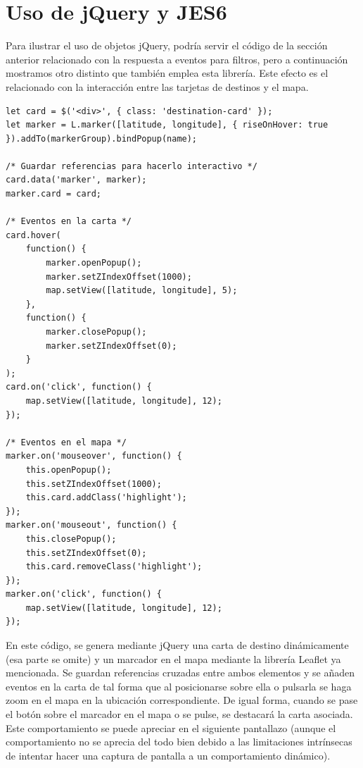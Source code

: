 \documentclass[11pt, a4paper]{book}
\begin{document}
	
	\section{Uso de jQuery y JES6}

    Para ilustrar el uso de objetos jQuery, podría servir el código de la sección anterior relacionado con la respuesta a eventos para filtros, pero a continuación mostramos otro distinto que también emplea esta librería. Este efecto es el relacionado con la interacción entre las tarjetas de destinos y el mapa. 

    \begin{lstlisting}
let card = $('<div>', { class: 'destination-card' });
let marker = L.marker([latitude, longitude], { riseOnHover: true }).addTo(markerGroup).bindPopup(name);

/* Guardar referencias para hacerlo interactivo */
card.data('marker', marker);
marker.card = card;

/* Eventos en la carta */
card.hover(
    function() {
        marker.openPopup();
        marker.setZIndexOffset(1000);
        map.setView([latitude, longitude], 5);
    },
    function() {
        marker.closePopup();
        marker.setZIndexOffset(0);
    }
);
card.on('click', function() {
    map.setView([latitude, longitude], 12);
});

/* Eventos en el mapa */
marker.on('mouseover', function() {
    this.openPopup();
    this.setZIndexOffset(1000);
    this.card.addClass('highlight');
});
marker.on('mouseout', function() {
    this.closePopup();
    this.setZIndexOffset(0);
    this.card.removeClass('highlight');
});
marker.on('click', function() {
    map.setView([latitude, longitude], 12);
});
    \end{lstlisting}

    En este código, se genera mediante jQuery una carta de destino dinámicamente (esa parte se omite) y un marcador en el mapa mediante la librería Leaflet ya mencionada. Se guardan referencias cruzadas entre ambos elementos y se añaden eventos en la carta de tal forma que al posicionarse sobre ella o pulsarla se haga zoom en el mapa en la ubicación correspondiente. De igual forma, cuando se pase el botón sobre el marcador en el mapa o se pulse, se destacará la carta asociada. Este comportamiento se puede apreciar en el siguiente pantallazo (aunque el comportamiento no se aprecia del todo bien debido a las limitaciones intrínsecas de intentar hacer una captura de pantalla a un comportamiento dinámico).
\end{document}
